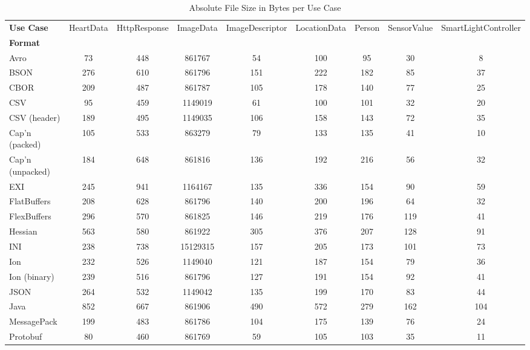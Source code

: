 \documentclass[10pt]{IEEEtran}
\begin{document}
\setlength{\tabcolsep}{0.4em} %
{\renewcommand{\arraystretch}{1.5}%
\begin{table*}[th]
    \centering
    \caption{Absolute File Size in Bytes per Use Case}
    \label{tab:sizes} 
    \begin{tabular}{|p{21mm}|c|c|c|c|c|c|c|c|}
    \hline
    \textbf{Use Case} & HeartData & HttpResponse & ImageData & ImageDescriptor & LocationData & Person & SensorValue & SmartLightController \\
    \textbf{Format} &  &  &  &  &  &  &  &  \\
    \hline
    Avro & 73 & 448 & 861767 & 54 & 100 & 95 & 30 & 8 \\ \hline
    BSON & 276 & 610 & 861796 & 151 & 222 & 182 & 85 & 37 \\ \hline
    CBOR & 209 & 487 & 861787 & 105 & 178 & 140 & 77 & 25 \\ \hline
    CSV & 95 & 459 & 1149019 & 61 & 100 & 101 & 32 & 20 \\ \hline
    CSV (header) & 189 & 495 & 1149035 & 106 & 158 & 143 & 72 & 35 \\ \hline
    Cap'n (packed) & 105 & 533 & 863279 & 79 & 133 & 135 & 41 & 10 \\ \hline
    Cap'n (unpacked) & 184 & 648 & 861816 & 136 & 192 & 216 & 56 & 32 \\ \hline
    EXI & 245 & 941 & 1164167 & 135 & 336 & 154 & 90 & 59 \\ \hline
    FlatBuffers & 208 & 628 & 861796 & 140 & 200 & 196 & 64 & 32 \\ \hline
    FlexBuffers & 296 & 570 & 861825 & 146 & 219 & 176 & 119 & 41 \\ \hline
    Hessian & 563 & 580 & 861922 & 305 & 376 & 207 & 128 & 91 \\ \hline
    INI & 238 & 738 & 15129315 & 157 & 205 & 173 & 101 & 73 \\ \hline
    Ion & 232 & 526 & 1149040 & 121 & 187 & 154 & 79 & 36 \\ \hline
    Ion (binary) & 239 & 516 & 861796 & 127 & 191 & 154 & 92 & 41 \\ \hline
    JSON & 264 & 532 & 1149042 & 135 & 199 & 170 & 83 & 44 \\ \hline
    Java & 852 & 667 & 861906 & 490 & 572 & 279 & 162 & 104 \\ \hline
    MessagePack & 199 & 483 & 861786 & 104 & 175 & 139 & 76 & 24 \\ \hline
    Protobuf & 80 & 460 & 861769 & 59 & 105 & 103 & 35 & 11 \\ \hline

\end{tabular}
\end{table*}}
\end{document}
